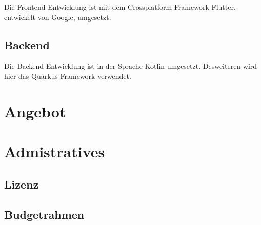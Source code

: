 \documentclass[12pt]{article}
\theoremstyle{definition}
\begin{document}
Die Frontend-Entwicklung ist mit dem Crossplatform-Framework Flutter, entwickelt von Google, umgesetzt.

\subsection{Backend}

Die Backend-Entwicklung ist in der Sprache Kotlin umgesetzt. Desweiteren wird hier das Quarkus-Framework verwendet.


\pagebreak

\section{Angebot}




\pagebreak

\section{Admistratives}

\subsection{Lizenz}

\subsection{Budgetrahmen}
\end{document}
